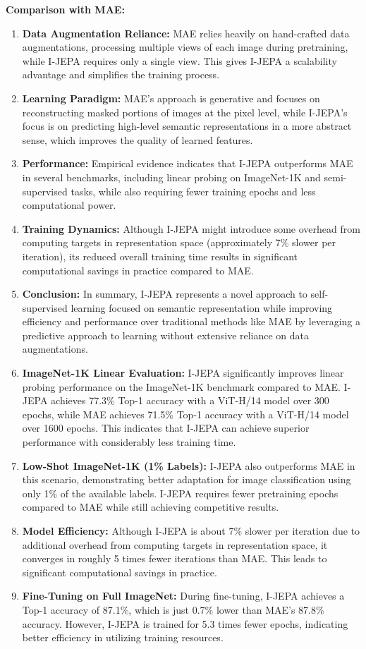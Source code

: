 \documentclass{article} %
\begin{document}
{\bf Comparison with MAE:}
\begin{enumerate}
   \item {\bf Data Augmentation Reliance:} MAE relies heavily on hand-crafted data augmentations, processing multiple views of each image during pretraining, while I-JEPA requires only a single view. This gives I-JEPA a scalability advantage and simplifies the training process.
   \item {\bf Learning Paradigm:} MAE's approach is generative and focuses on reconstructing masked portions of images at the pixel level, while I-JEPA's focus is on predicting high-level semantic representations in a more abstract sense, which improves the quality of learned features.
   \item {\bf Performance:} Empirical evidence indicates that I-JEPA outperforms MAE in several benchmarks, including linear probing on ImageNet-1K and semi-supervised tasks, while also requiring fewer training epochs and less computational power.
   \item {\bf Training Dynamics:} Although I-JEPA might introduce some overhead from computing targets in representation space (approximately {7\%} slower per iteration), its reduced overall training time results in significant computational savings in practice compared to MAE.
   \item {\bf Conclusion:} In summary, I-JEPA represents a novel approach to self-supervised learning focused on semantic representation while improving efficiency and performance over traditional methods like MAE by leveraging a predictive approach to learning without extensive reliance on data augmentations.
   \item {\bf ImageNet-1K Linear Evaluation:} I-JEPA significantly improves linear probing performance on the ImageNet-1K benchmark compared to MAE. I-JEPA achieves 77.3\% Top-1 accuracy with a ViT-H/14 model over 300 epochs, while MAE achieves 71.5\% Top-1 accuracy with a ViT-H/14 model over 1600 epochs. This indicates that I-JEPA can achieve superior performance with considerably less training time.
   \item {\bf Low-Shot ImageNet-1K (1\% Labels):} I-JEPA also outperforms MAE in this scenario, demonstrating better adaptation for image classification using only 1\% of the available labels. I-JEPA requires fewer pretraining epochs compared to MAE while still achieving competitive results.
   \item {\bf Model Efficiency:} Although I-JEPA is about 7\% slower per iteration due to additional overhead from computing targets in representation space, it converges in roughly 5 times fewer iterations than MAE. This leads to significant computational savings in practice.
   \item {\bf Fine-Tuning on Full ImageNet:} During fine-tuning, I-JEPA achieves a Top-1 accuracy of 87.1\%, which is just 0.7\% lower than MAE's 87.8\% accuracy. However, I-JEPA is trained for 5.3 times fewer epochs, indicating better efficiency in utilizing training resources.
\end{enumerate}
\end{document}
